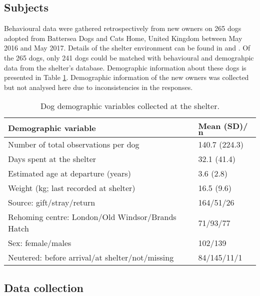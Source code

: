 \documentclass[12pt]{article}
\begin{document}
\subsection{Subjects}
Behavioural data were gathered retrospectively from new owners on 265 dogs adopted from Battersea Dogs and Cats Home, United Kingdom between May 2016 and May 2017. Details of the shelter environment can be found in \textcite{goold2017aggressiveness} and \textcite{goold2017modelling}. Of the 265 dogs, only 241 dogs could be matched with behavioural and demograhpic data from the shelter's database. Demographic information about these dogs is presented in Table \ref{table_demoshelter}. Demographic information of the new owners was collected but not analysed here due to inconsistencies in the responses.

\begin{table}
  \centering
  \begin{tabular}{ll}
  \textbf{Demographic variable} & \textbf{Mean (SD)/$\boldsymbol{n}$}\\ \hline
  Number of total observations per dog & 140.7 (224.3) \\
  Days spent at the shelter & 32.1 (41.4)\\
  Estimated age at departure (years) & 3.6 (2.8)\\
  Weight (kg; last recorded at shelter) & 16.5 (9.6)\\
  Source: gift/stray/return & 164/51/26\\
  Rehoming centre: London/Old Windsor/Brands Hatch & 71/93/77\\
  Sex: female/males & 102/139\\
  Neutered: before arrival/at shelter/not/missing & 84/145/11/1 \\ \hline
  \end{tabular}
  \caption{Dog demographic variables collected at the shelter.}
  \label{table_demoshelter}
\end{table}

\subsection{Data collection}
\end{document}

